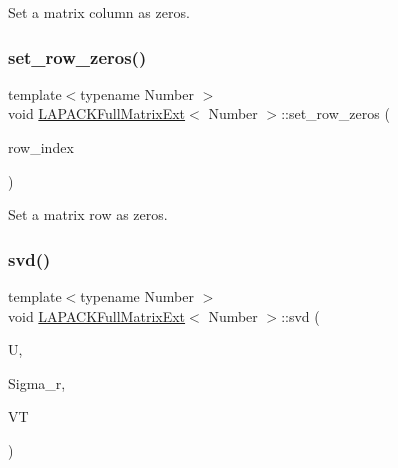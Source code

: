 Set a matrix column as zeros. \mbox{\label{classLAPACKFullMatrixExt_abf191c72c4a8813470f32c6107f2ffbc}} 
\subsubsection{\texorpdfstring{set\+\_\+row\+\_\+zeros()}{set\_row\_zeros()}}
{\footnotesize\ttfamily template$<$typename Number $>$ \\
void \hyperlink{classLAPACKFullMatrixExt}{L\+A\+P\+A\+C\+K\+Full\+Matrix\+Ext}$<$ Number $>$\+::set\+\_\+row\+\_\+zeros (\begin{DoxyParamCaption}\item[{const \hyperlink{classLAPACKFullMatrixExt_a5cf5f4a6104dc17029210b5ca52bf574}{size\+\_\+type}}]{row\+\_\+index }\end{DoxyParamCaption})}

Set a matrix row as zeros. \mbox{\label{classLAPACKFullMatrixExt_a5be14a4d7f9c615f940e870b85d09ecd}} 
\subsubsection{\texorpdfstring{svd()}{svd()}\hspace{0.1cm}{\footnotesize\ttfamily [1/2]}}
{\footnotesize\ttfamily template$<$typename Number $>$ \\
void \hyperlink{classLAPACKFullMatrixExt}{L\+A\+P\+A\+C\+K\+Full\+Matrix\+Ext}$<$ Number $>$\+::svd (\begin{DoxyParamCaption}\item[{\hyperlink{classLAPACKFullMatrixExt}{L\+A\+P\+A\+C\+K\+Full\+Matrix\+Ext}$<$ Number $>$ \&}]{U,  }\item[{std\+::vector$<$ typename numbers\+::\+Number\+Traits$<$ Number $>$\+::real\+\_\+type $>$ \&}]{Sigma\+\_\+r,  }\item[{\hyperlink{classLAPACKFullMatrixExt}{L\+A\+P\+A\+C\+K\+Full\+Matrix\+Ext}$<$ Number $>$ \&}]{VT }\end{DoxyParamCaption})}

